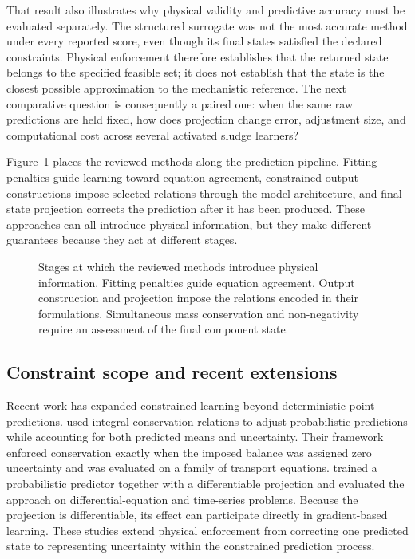 That result also illustrates why physical validity and predictive accuracy must be evaluated separately. The structured surrogate was not the most accurate method under every reported score, even though its final states satisfied the declared constraints. Physical enforcement therefore establishes that the returned state belongs to the specified feasible set; it does not establish that the state is the closest possible approximation to the mechanistic reference. The next comparative question is consequently a paired one: when the same raw predictions are held fixed, how does projection change error, adjustment size, and computational cost across several activated sludge learners?

Figure~\ref{fig:rrl_enforcement_locations} places the reviewed methods along the prediction pipeline. Fitting penalties guide learning toward equation agreement, constrained output constructions impose selected relations through the model architecture, and final-state projection corrects the prediction after it has been produced. These approaches can all introduce physical information, but they make different guarantees because they act at different stages.

\begin{figure}[htbp]
\centering
\begingroup\linespread{1}\selectfont

\endgroup
\caption{Stages at which the reviewed methods introduce physical information. Fitting penalties guide equation agreement. Output construction and projection impose the relations encoded in their formulations. Simultaneous mass conservation and non-negativity require an assessment of the final component state.}
\label{fig:rrl_enforcement_locations}
\end{figure}

\subsection{Constraint scope and recent extensions}

Recent work has expanded constrained learning beyond deterministic point predictions. \citet{Hansen2024} used integral conservation relations to adjust probabilistic predictions while accounting for both predicted means and uncertainty. Their framework enforced conservation exactly when the imposed balance was assigned zero uncertainty and was evaluated on a family of transport equations. \citet{Utkarsh2025} trained a probabilistic predictor together with a differentiable projection and evaluated the approach on differential-equation and time-series problems. Because the projection is differentiable, its effect can participate directly in gradient-based learning. These studies extend physical enforcement from correcting one predicted state to representing uncertainty within the constrained prediction process.


